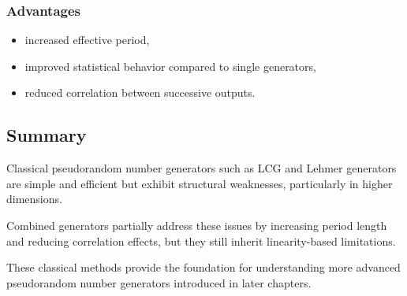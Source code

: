 \subsubsection{Advantages}

\begin{itemize}
    \item increased effective period,
    \item improved statistical behavior compared to single generators,
    \item reduced correlation between successive outputs.
\end{itemize}

\subsection{Summary}

Classical pseudorandom number generators such as LCG and Lehmer generators are simple and efficient but exhibit structural weaknesses, particularly in higher dimensions.

Combined generators partially address these issues by increasing period length and reducing correlation effects, but they still inherit linearity-based limitations.

These classical methods provide the foundation for understanding more advanced pseudorandom number generators introduced in later chapters.